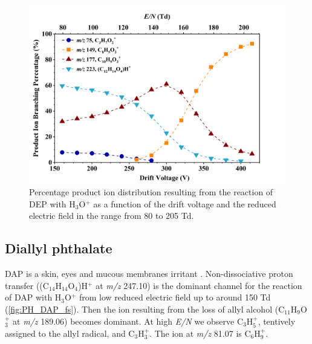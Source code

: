 \begin{figure}[htbp]
\centering
\includegraphics[height=0.4\textheight]{pics/DEP-BR.png}
\caption{Percentage product ion distribution resulting from the reaction of DEP with H$_3$O$^+$ as a function of the drift voltage and the reduced electric field in the range from 80 to 205 Td.}
\label{fig:PH_DEP_fs}
\end{figure}





\subsection{Diallyl phthalate}
DAP is a skin, eyes and mucous membranes irritant \cite{clayton1981patty}.
Non-dissociative proton transfer ((C$_{14}$H$_{14}$O$_4$)H$^+$ at \textit{m/z} 247.10) is the dominant channel for the reaction of DAP with H$_3$O$^+$ from low reduced electric field up to around 150 Td (\autoref{fig:PH_DAP_fs}). Then the ion resulting from the loss of allyl alcohol (C$_{11}$H$_9$O$_3^+$ at \textit{m/z} 189.06) becomes dominant. At high \textit{E/N} we observe C$_3$H$_5^+$, tentively assigned to  the allyl radical,  and C$_3$H$_3^+$.
The ion at \textit{m/z} 81.07 is C$_6$H$_9^+$.








